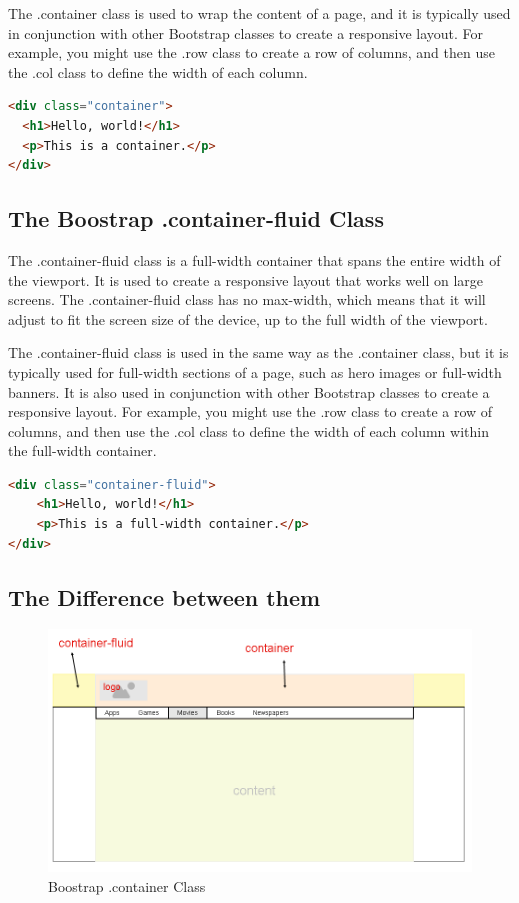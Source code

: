 \documentclass[11pt]{article}
\begin{document}
The .container class is used to wrap the content of a page, and it is typically used in conjunction with other Bootstrap classes to create a responsive layout. For example, you might use the .row class to create a row of columns, and then use the .col class to define the width of each column.

\begin{lstlisting}[language=html]
<div class="container">
  <h1>Hello, world!</h1>
  <p>This is a container.</p>
</div>
\end{lstlisting}

\subsection{The Boostrap .container-fluid Class}

The .container-fluid class is a full-width container that spans the entire width of the viewport. It is used to create a responsive layout that works well on large screens. The .container-fluid class has no max-width, which means that it will adjust to fit the screen size of the device, up to the full width of the viewport.

The .container-fluid class is used in the same way as the .container class, but it is typically used for full-width sections of a page, such as hero images or full-width banners. It is also used in conjunction with other Bootstrap classes to create a responsive layout. For example, you might use the .row class to create a row of columns, and then use the .col class to define the width of each column within the full-width container.

\begin{lstlisting}[language=html]
<div class="container-fluid">
    <h1>Hello, world!</h1>
    <p>This is a full-width container.</p>
</div>
\end{lstlisting}

\subsection{The Difference between them}

\begin{figure}[H]
    \centering
    \includegraphics[width=.85\textwidth]{27ixZ.png}
    \caption{Boostrap .container Class}
\end{figure}
\end{document}
